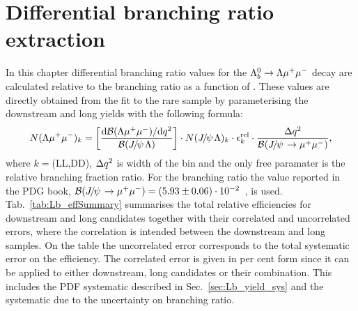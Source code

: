 \chapter{Differential branching ratio extraction}
\label{sec:Lb_BRsummary}

In this chapter differential branching ratio values for the $\Lambda^0_b\rightarrow\Lambda\mu^+\mu^-$ decay are calculated 
relative to the \Lb\ra\jpsi\Lz branching ratio as a function of \qsq.
These values are directly obtained from the fit to the rare sample by parameterising
the downstream and long yields with the following formula:
%
\begin{equation}
N(\Lz\mumu)_{k}  = \left[ \frac{\mathrm{d}\mathcal{B}(\Lz\mumu)/\mathrm{d}\qsq}{\mathcal{B}(\jpsi\Lz)} \right]  \cdot
N(\jpsi\Lz)_{k} \cdot \epsilon^{\mathrm{rel}}_{k} \cdot \frac {\Delta\qsq} { \mathcal{B}(\jpsi\to\mumu) },
\label{eq:ield_from_BR}
\end{equation}
\noindent
where $k = $(LL,DD), $\Delta q^2$ is width of the \qsq bin and the only free paramater is the relative
branching fraction ratio.%
For the \jpsi\to\mumu branching ratio the value reported in the PDG book,
$\mathcal{B}(\jpsi\to\mumu) = (5.93 \pm 0.06)\cdot 10^{-2}$~\cite{PDG2014}, is used.
%
Tab.~\ref{tab:Lb_effSummary} summarises the total relative efficiencies for downstream and long candidates
together with their correlated and uncorrelated errors, where the correlation is intended between the downstream and long 
samples. %
On the table the uncorrelated error corresponds to the total systematic error on the efficiency.
The correlated error is given in per cent form since it can be applied to either downstream, long candidates or their combination.
This includes the PDF systematic described in Sec.~\ref{sec:Lb_yield_sys} and the systematic due to the uncertainty on \jpsi\to\mumu branching ratio.

